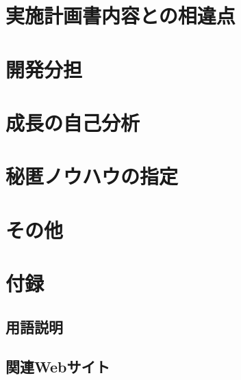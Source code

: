 \documentclass[uplatex,a4paper,12pt]{jsarticle}
\begin{document}
\section{実施計画書内容との相違点}

\section{開発分担}

\section{成長の自己分析}

\section{秘匿ノウハウの指定}

\section{その他}

\section{付録}

\subsection{用語説明}

\subsection{関連Webサイト}
\end{document}
